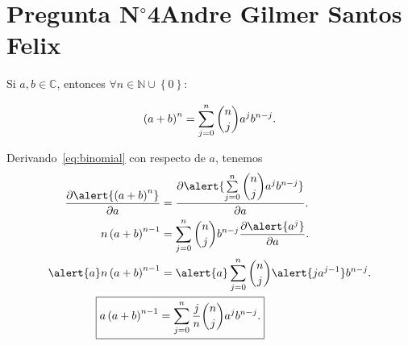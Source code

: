 \section{Pregunta N$^{\circ}$4\qquad Andre Gilmer Santos Felix}

\begin{frame}
	\begin{theorem}
		Si $a,b\in\mathbb{C}$, entonces
		\begin{math}
			\forall n\in\mathbb{N}\cup\left\{0\right\}:
		\end{math}

		\begin{equation}\label{eq:binomial}
			\left(a+b\right)^{n}=
			\sum\limits_{j=0}^{n}
			\dbinom{n}{j}
			a^{j}
			b^{n-j}.
		\end{equation}
	\end{theorem}

	Derivando~\eqref{eq:binomial} con respecto de $a$, tenemos
	\begin{align}
		\diffp{
			\alert{
				\left(a+b\right)^{n}
			}
		}{a}                    & =
		\diffp{
			\alert{
				\sum\limits_{j=0}^{n}
				\dbinom{n}{j}
				a^{j}
				b^{n-j}
			}
		}{a}.  \notag               \\
		n\left(a+b\right)^{n-1} & =
		\sum\limits_{j=0}^{n}
		\dbinom{n}{j}
		b^{n-j}
		\diffp{
			\alert{
				a^{j}
			}
		}{a}.   \notag              \\
		\alert{a}
		n\left(a+b\right)^{n-1}
		                        & =
		\alert{a}
		\sum\limits_{j=0}^{n}
		\dbinom{n}{j}
		\alert{ja^{j-1}}
		b^{n-j}.      \notag        \\
		\label{eq:binomial_I}
		\Aboxed{
			a\left(a+b\right)^{n-1}
		                        & =
			\sum\limits_{j=0}^{n}
			\dfrac{j}{n}
			\dbinom{n}{j}
			a^{j}
			b^{n-j}.
		}
	\end{align}
\end{frame}

